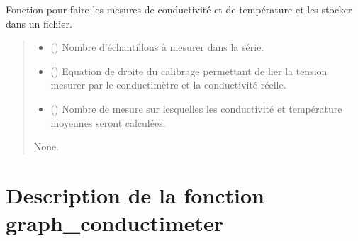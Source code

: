 \documentclass[letterpaper,10pt,french]{sphinxmanual}
\begin{document}
\begin{fulllineitems}
\label{\detokenize{Documentation:ADNI_ProgrammePython.Mesures}}
\pysigstartsignatures
{}
\pysigstopsignatures
\sphinxAtStartPar
Fonction pour faire les mesures de conductivité et de température et les stocker dans un fichier.
\begin{quote}\begin{description}
\begin{itemize}
\item {} 
\sphinxAtStartPar
{} () \textendash{} Nombre d’échantillons à mesurer dans la série.

\item {} 
\sphinxAtStartPar
{} () \textendash{} Equation de droite du calibrage permettant de lier la tension mesurer par le conductimètre et la conductivité réelle.

\item {} 
\sphinxAtStartPar
{} () \textendash{} Nombre de mesure sur lesquelles les conductivité et température moyennes seront calculées.

\end{itemize}

\sphinxAtStartPar
None.

\end{description}\end{quote}

\end{fulllineitems}



\section{Description de la fonction graph\_conductimeter}
\label{\detokenize{Documentation:description-de-la-fonction-graph-conductimeter}}
\end{document}
